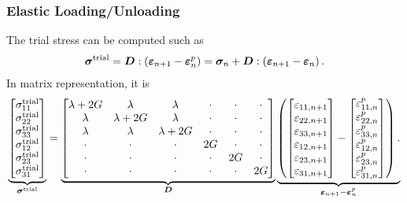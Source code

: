 \subsubsection{Elastic Loading/Unloading}
The trial stress can be computed such as
\begin{gather}\label{eq:j2_tsigma}
\bm{\sigma}^\text{trial}=\bm{D}:\left(\bm{\varepsilon}_{n+1}-\bm{\varepsilon}^p_n\right)=\bm{\sigma}_n+\bm{D}:\left(\bm{\varepsilon}_{n+1}-\bm{\varepsilon}_n\right).
\end{gather}
In matrix representation, it is
\begin{gather}
\underbrace{
\begin{bmatrix}
\sigma^\text{trial}_{11}\\
\sigma^\text{trial}_{22}\\
\sigma^\text{trial}_{33}\\
\sigma^\text{trial}_{12}\\
\sigma^\text{trial}_{23}\\
\sigma^\text{trial}_{31}
\end{bmatrix}}_{\bm{\sigma}^\text{trial}}
=
\underbrace{\begin{bmatrix}
\lambda+2G&\lambda&\lambda&\cdot&\cdot&\cdot\\
\lambda&\lambda+2G&\lambda&\cdot&\cdot&\cdot\\
\lambda&\lambda&\lambda+2G&\cdot&\cdot&\cdot\\
\cdot&\cdot&\cdot&2G&\cdot&\cdot\\
\cdot&\cdot&\cdot&\cdot&2G&\cdot\\
\cdot&\cdot&\cdot&\cdot&\cdot&2G
\end{bmatrix}}_{\bm{D}}
\underbrace{\left(\begin{bmatrix}
        \varepsilon_{11,n+1} \\
        \varepsilon_{22,n+1} \\
        \varepsilon_{33,n+1} \\
        \varepsilon_{12,n+1} \\
        \varepsilon_{23,n+1} \\
        \varepsilon_{31,n+1}
    \end{bmatrix}-\begin{bmatrix}
        \varepsilon^p_{11,n} \\
        \varepsilon^p_{22,n} \\
        \varepsilon^p_{33,n} \\
        \varepsilon^p_{12,n} \\
        \varepsilon^p_{23,n} \\
        \varepsilon^p_{31,n}
    \end{bmatrix}
    \right).}_{\bm{\varepsilon}_{n+1}-\bm{\varepsilon}^p_n}
\end{gather}
